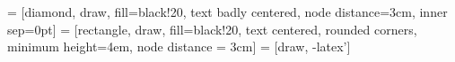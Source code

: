 \usepackage{tikz}
\usetikzlibrary{shapes,arrows}

 = [diamond, draw, fill=black!20, text badly centered, node distance=3cm, inner sep=0pt]
 = [rectangle, draw, fill=black!20, text centered, rounded corners, minimum height=4em, node distance = 3cm]
 = [draw, -latex']
